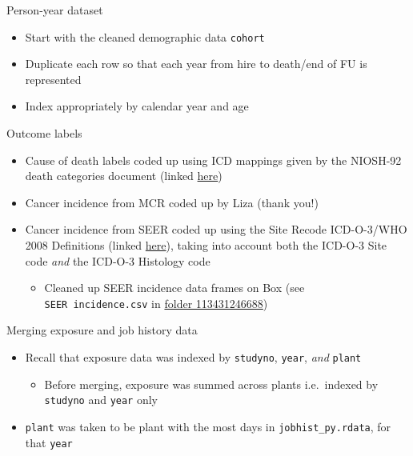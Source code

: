 \documentclass[
  ignorenonframetext,
  aspectratio=169,
]{beamer}
\providecommand{\tightlist}{%
  \setlength{\itemsep}{0pt}\setlength{\parskip}{0pt}}
\begin{document}
\begin{frame}[fragile]{Person-year dataset}
\protect\hypertarget{person-year-dataset}{}

\begin{itemize}
\tightlist
\item
  Start with the cleaned demographic data \texttt{cohort}
\item
  Duplicate each row so that each year from hire to death/end of FU is
  represented
\item
  Index appropriately by calendar year and age
\end{itemize}

\end{frame}

\begin{frame}[fragile]{Outcome labels}
\protect\hypertarget{outcome-labels}{}

\begin{itemize}
\tightlist
\item
  Cause of death labels coded up using ICD mappings given by the
  NIOSH-92 death categories document (linked
  \href{https://www.cdc.gov/niosh/ltas/pdf/Rate-Info-Table-3.pdf}{here})
\item
  Cancer incidence from MCR coded up by Liza (thank you!)
\item
  Cancer incidence from SEER coded up using the Site Recode ICD-O-3/WHO
  2008 Definitions (linked
  \href{https://seer.cancer.gov/siterecode/icdo3_dwhoheme/index.html}{here}),
  taking into account both the ICD-O-3 Site code \emph{and} the ICD-O-3
  Histology code

  \begin{itemize}
  \tightlist
  \item
    Cleaned up SEER incidence data frames on Box (see
    \texttt{SEER\ incidence.csv} in
    \href{https://berkeley.app.box.com/folder/113431246688}{folder
    113431246688})
  \end{itemize}
\end{itemize}

\end{frame}

\begin{frame}[fragile]{Merging exposure and job history data}
\protect\hypertarget{merging-exposure-and-job-history-data}{}

\begin{itemize}
\tightlist
\item
  Recall that exposure data was indexed by \texttt{studyno},
  \texttt{year}, \emph{and} \texttt{plant}

  \begin{itemize}
  \tightlist
  \item
    Before merging, exposure was summed across plants i.e.~indexed by
    \texttt{studyno} and \texttt{year} only
  \end{itemize}
\item
  \texttt{plant} was taken to be plant with the most days in
  \texttt{jobhist\_py.rdata}, for that \texttt{year}
\end{itemize}

\end{frame}
\end{document}
